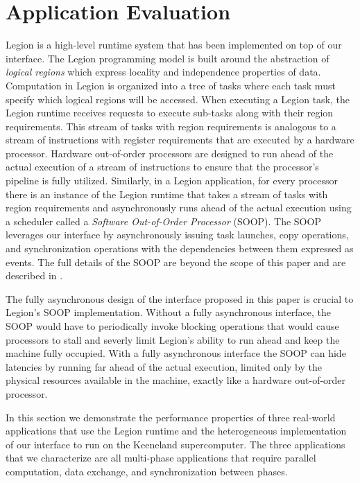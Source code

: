 
\section{Application Evaluation}
\label{sec:apps}
Legion is a high-level runtime system that has been implemented on top
of our interface\cite{Legion12}.  
The Legion programming model is built around the abstraction of 
{\em logical regions} which express locality and independence properties 
of data.  Computation in Legion is organized into a tree of tasks where 
each task must specify which logical regions will be accessed.
When executing a Legion task, the Legion runtime receives requests
to execute sub-tasks along with their region requirements.
This stream of tasks with region requirements is analogous to a stream
of instructions with register requirements that are executed by 
a hardware processor.  Hardware out-of-order processors are designed to
run ahead of the actual execution of a stream of instructions
to ensure that the processor's pipeline is fully utilized.  Similarly, in a
Legion application, for every processor there is an instance of the Legion runtime
that takes a stream of tasks with region requirements and asynchronously
runs ahead of the actual execution using a scheduler called a {\em Software Out-of-Order Processor} 
(SOOP).  The SOOP leverages our interface by asynchronously issuing task launches, copy
operations, and synchronization operations with the dependencies between them expressed
as events.  The full details of the SOOP are beyond the scope of this paper
and are described in \cite{Legion12}.

The fully asynchronous design of the interface proposed in
this paper is crucial to Legion's SOOP implementation.  Without a fully
asynchronous interface, the SOOP would have to periodically invoke
blocking operations that would cause processors to stall and severly
limit Legion's ability to run ahead and keep the machine fully
occupied.  With a fully asynchronous interface the SOOP can hide latencies by 
running
far ahead of the actual execution, limited only by the physical resources
available in the machine, exactly like a hardware out-of-order processor.

In this section we demonstrate the performance properties of three
real-world applications that use the Legion runtime and the heterogeneous
implementation of our interface to run on the Keeneland supercomputer.
The three applications that we characterize are all multi-phase
applications that require parallel computation, data exchange, and
synchronization between phases. 

